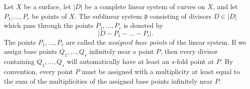 Let $X$ be a surface, let $|D|$ be a complete linear system of curves on $X$, and let $P_1, \ldots, P_r$ be points of $X$. The sublinear system $\mathfrak{d}$ consisting of divisors $D \in |D|$ which pass through the points $P_1, \ldots, P_r$ is denoted by
$$|D - P_1 - \ldots - P_r|.$$
The points $P_1, \ldots, P_r$ are called the \textit{assigned base points} of the linear system. If we assign base points $Q_1, \ldots, Q_s$ infinitely near a point $P$, then every divisor containing $Q_1, \ldots, Q_s$ will automatically have at least an $s$-fold point at $P$. By convention, every point $P$ must be assigned with a multiplicity at least equal to the sum of the multiplicities of the assigned base points infinitely near $P$.
